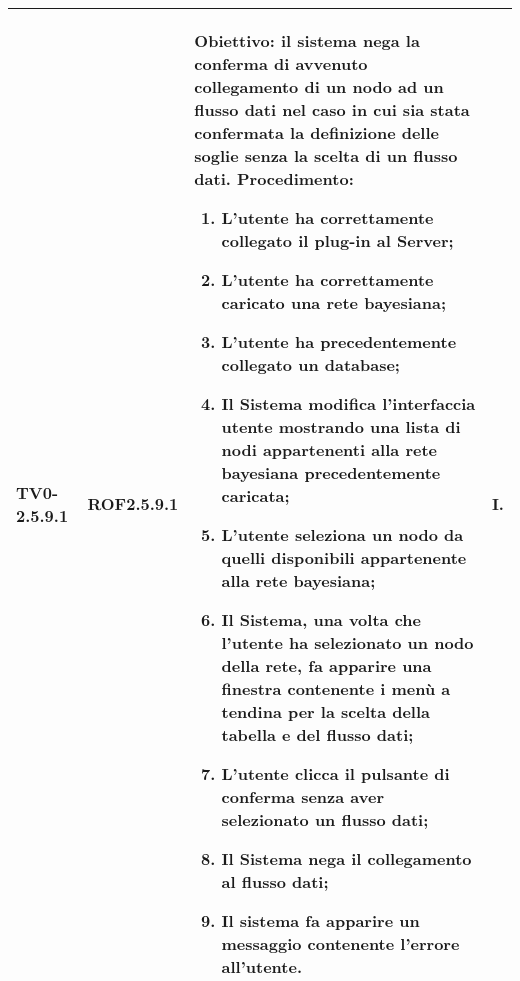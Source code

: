 \begin{longtable}{|C{.15\textwidth}|C{.13\textwidth}|m{.52\textwidth}|C{.08\textwidth}|}
TV0-2.5.9.1 & ROF2.5.9.1  &
	\textbf{Obiettivo}: il sistema nega la conferma di avvenuto collegamento di un nodo ad un flusso dati nel caso in cui sia stata confermata la definizione delle soglie senza la scelta di un flusso dati. \newline
	\textbf{Procedimento}:
	\begin{enumerate}
		\item L'utente ha correttamente collegato il plug-in al Server;
		\item L'utente ha correttamente caricato una rete bayesiana;
		\item L'utente ha precedentemente collegato un database;
		\item Il Sistema modifica l'interfaccia utente mostrando una lista di nodi appartenenti alla rete bayesiana precedentemente caricata;
		\item L'utente seleziona un nodo da quelli disponibili appartenente alla rete bayesiana;
		\item Il Sistema, una volta che l'utente ha selezionato un nodo della rete, fa apparire una finestra contenente i menù a tendina per la scelta della tabella e del flusso dati;
		\item L'utente clicca il pulsante di conferma senza aver selezionato un flusso dati;
		\item Il Sistema nega il collegamento al flusso dati;
		\item Il sistema fa apparire un messaggio contenente l'errore all'utente.
	\end{enumerate}
	& I. \\
\hline


\end{longtable}
